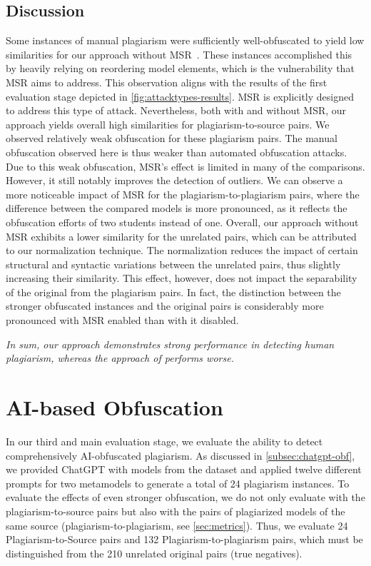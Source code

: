 \subsection{Discussion}
Some instances of manual plagiarism were sufficiently well-obfuscated to yield low similarities for our approach without MSR~\cite{Saglam2022}.
These instances accomplished this by heavily relying on reordering model elements, which is the vulnerability that MSR aims to address.
This observation aligns with the results of the first evaluation stage depicted in \autoref{fig:attacktypes-results}. MSR is explicitly designed to address this type of attack.
%
Nevertheless, both with and without MSR, our approach yields overall high similarities for plagiarism-to-source pairs.
We observed relatively weak obfuscation for these plagiarism pairs. The manual obfuscation observed here is thus weaker than automated obfuscation attacks.
Due to this weak obfuscation, MSR's effect is limited in many of the comparisons. However, it still notably improves the detection of outliers. 
We can observe a more noticeable impact of MSR for the plagiarism-to-plagiarism pairs, where the difference between the compared models is more pronounced, as it reflects the obfuscation efforts of two students instead of one.
%
Overall, our approach without MSR exhibits a lower similarity for the unrelated pairs, which can be attributed to our normalization technique.
The normalization reduces the impact of certain structural and syntactic variations between the unrelated pairs, thus slightly increasing their similarity.
This effect, however, does not impact the separability of the original from the plagiarism pairs.
In fact, the distinction between the stronger obfuscated instances and the original pairs is considerably more pronounced with MSR enabled than with it disabled.

\emph{In sum, our approach demonstrates strong performance in detecting human plagiarism, whereas the approach of \citet{Martinez2020} performs worse.}



\section{AI-based Obfuscation}\label{subsubsec:plaggpt}

\noindent
In our third and main evaluation stage, we evaluate the ability to detect comprehensively AI-obfuscated plagiarism.
%
As discussed in \autoref{subsec:chatgpt-obf}, we provided ChatGPT with models from the dataset and applied twelve different prompts for two metamodels to generate a total of 24 plagiarism instances. To evaluate the effects of even stronger obfuscation, we do not only evaluate with the plagiarism-to-source pairs but also with the pairs of plagiarized models of the same source (plagiarism-to-plagiarism, see \autoref{sec:metrics}).
Thus, we evaluate 24 Plagiarism-to-Source pairs and 132 Plagiarism-to-plagiarism pairs, which must be distinguished from the 210 unrelated original pairs (true negatives).

